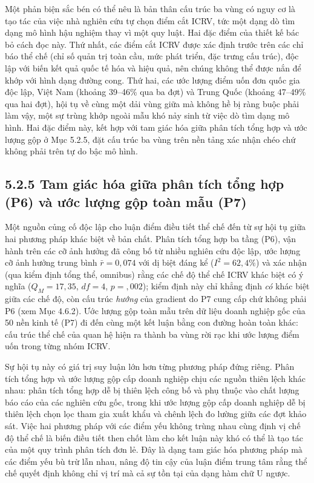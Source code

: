 \documentclass[
  a4paper,
  13pt]{extreport}
\begin{document}
Một phản biện sắc bén có thể nêu là bản thân cấu trúc ba vùng có nguy cơ
là tạo tác của việc nhà nghiên cứu tự chọn điểm cắt ICRV, tức một dạng
dò tìm dạng mô hình hậu nghiệm thay vì một quy luật. Hai đặc điểm của
thiết kế bác bỏ cách đọc này. Thứ nhất, các điểm cắt ICRV được xác định
trước trên các chỉ báo thể chế (chỉ số quản trị toàn cầu, mức phát
triển, đặc trưng cấu trúc), độc lập với biến kết quả quốc tế hóa và hiệu
quả, nên chúng không thể được nắn để khớp với hình dạng đường cong. Thứ
hai, các ước lượng điểm uốn đơn quốc gia độc lập, Việt Nam (khoảng
39--46\% qua ba đợt) và Trung Quốc (khoảng 47--49\% qua hai đợt), hội tụ
về cùng một dải vùng giữa mà không hề bị ràng buộc phải làm vậy, một sự
trùng khớp ngoài mẫu khó nảy sinh từ việc dò tìm dạng mô hình. Hai đặc
điểm này, kết hợp với tam giác hóa giữa phân tích tổng hợp và ước lượng
gộp ở Mục 5.2.5, đặt cấu trúc ba vùng trên nền tảng xác nhận chéo chứ
không phải trên tự do bậc mô hình.

\hypertarget{tam-giuxe1c-huxf3a-giux1eefa-phuxe2n-tuxedch-tux1ed5ng-hux1ee3p-p6-vuxe0-ux1b0ux1edbc-lux1b0ux1ee3ng-gux1ed9p-touxe0n-mux1eabu-p7}{%
\subsection{5.2.5 Tam giác hóa giữa phân tích tổng hợp (P6) và ước lượng
gộp toàn mẫu
(P7)}\label{tam-giuxe1c-huxf3a-giux1eefa-phuxe2n-tuxedch-tux1ed5ng-hux1ee3p-p6-vuxe0-ux1b0ux1edbc-lux1b0ux1ee3ng-gux1ed9p-touxe0n-mux1eabu-p7}}

Một nguồn củng cố độc lập cho luận điểm điều tiết thể chế đến từ sự hội
tụ giữa hai phương pháp khác biệt về bản chất. Phân tích tổng hợp ba
tầng (P6), vận hành trên các cỡ ảnh hưởng đã công bố từ nhiều nghiên cứu
độc lập, ước lượng cỡ ảnh hưởng trung bình \(\bar{r} = 0{,}074\) với dị
biệt đáng kể (\(I^2 = 62{,}4\%\)) và xác nhận (qua kiểm định tổng thể,
omnibus) rằng các chế độ thể chế ICRV khác biệt có ý nghĩa
(\(Q_M = 17{,}35\), \(df = 4\), \(p = {,}002\)); kiểm định này chỉ khẳng
định \emph{có} khác biệt giữa các chế độ, còn cấu trúc \emph{hướng} của
gradient do P7 cung cấp chứ không phải P6 (xem Mục 4.6.2). Ước lượng gộp
toàn mẫu trên dữ liệu doanh nghiệp gốc của 50 nền kinh tế (P7) đi đến
cùng một kết luận bằng con đường hoàn toàn khác: cấu trúc thể chế của
quan hệ hiện ra thành ba vùng rời rạc khi ước lượng điểm uốn trong từng
nhóm ICRV.

Sự hội tụ này có giá trị suy luận lớn hơn từng phương pháp đứng riêng.
Phân tích tổng hợp và ước lượng gộp cấp doanh nghiệp chịu các nguồn
thiên lệch khác nhau: phân tích tổng hợp dễ bị thiên lệch công bố và phụ
thuộc vào chất lượng báo cáo của các nghiên cứu gốc, trong khi ước lượng
gộp cấp doanh nghiệp dễ bị thiên lệch chọn lọc tham gia xuất khẩu và
chênh lệch đo lường giữa các đợt khảo sát. Việc hai phương pháp với các
điểm yếu không trùng nhau cùng định vị chế độ thể chế là biến điều tiết
then chốt làm cho kết luận này khó có thể là tạo tác của một quy trình
phân tích đơn lẻ. Đây là dạng tam giác hóa phương pháp mà các điểm yếu
bù trừ lẫn nhau, nâng độ tin cậy của luận điểm trung tâm rằng thể chế
quyết định không chỉ vị trí mà cả sự tồn tại của dạng hàm chữ U ngược.
\end{document}
